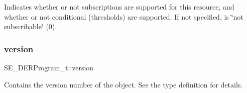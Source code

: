 Indicates whether or not subscriptions are supported for this resource, and whether or not conditional (thresholds) are supported. If not specified, is \char`\"{}not subscribable\char`\"{} (0). \mbox{\label{group__DERProgram_gaad375ff269dc0a412646ee4e5beeb68d}} 
\subsubsection{\texorpdfstring{version}{version}}
{\footnotesize\ttfamily S\+E\+\_\+\+D\+E\+R\+Program\+\_\+t\+::version}

Contains the version number of the object. See the type definition for details. 